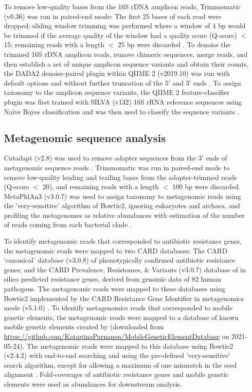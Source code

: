 To remove low-quality bases from the 16S rDNA amplicon reads, Trimmomatic (v0.36) was run in paired-end mode:
The first 25 bases of each read were dropped; sliding window trimming was performed where a window of 4 bp would be trimmed if the average quality of the window had a quality score (Q-score) $<$ 15; remaining reads with a length $<$ 25 bp were discarded \parencite{Bolger.2014}.
To denoise the trimmed 16S rDNA amplicon reads, remove chimeric sequences, merge reads, and then establish a set of unique amplicon sequence variants and obtain their counts, the DADA2 denoise-paired plugin  within QIIME 2 (v2019.10) was run with default options and without further truncation of the 5’ and 3’ ends \parencite{Callahan.2016, Bolyen.2019}.
To assign taxonomy to the amplicon sequence variants, the QIIME 2 feature-classifier plugin was first trained with SILVA (v132) 16S rRNA reference sequences using Naïve Bayes classification and was then used to classify the sequence variants \parencite{Quast.2013, Bokulich.2018}.

\subsection{Metagenomic sequence analysis}

Cutadapt (v2.8) was used to remove adapter sequences from the 3’ ends of metagenomic sequence reads \parencite{Martin.2011}.
Trimmomatic was run in paired-end mode to remove low-quality leading and trailing bases from the adapter-trimmed reads (Q-score $<$ 20), and remaining reads with a length $<$ 100 bp were discarded.
MetaPhlAn3 (v3.0.7) was used to assign taxonomy to metagenomic reads using the 'very-sensitive' algorithm of Bowtie2, ignoring eukaryotes and archaea, and profiling the metagenomes as relative abundances with estimation of the number of reads coming from each bacterial clade \parencite{Beghini.2020}.

To identify metagenomic reads that corresponded to antibiotic resistance genes, the metagenomic reads were mapped to two CARD databases:
The CARD ‘canonical’ database (v3.0.8) of phenotypically confirmed antibiotic resistance genes; and the CARD Prevalence, Resistomes, \& Variants (v3.0.7) database of in silico predicted resistance genes, derived from genomic data of 82 human pathogens.
The metagenomic reads were mapped to these databases using Bowtie2 implemented by the CARD Resistance Gene Identifier in metagenomics mode (v5.1.0) \parencite{Alcock.2020}.
To identify metagenomics reads that corresponded to mobile genetic elements, the metagenomic reads were mapped to a database of known mobile genetic elements created by \cite{Parnanen.2018} (downloaded from \url{https://github.com/KatariinaParnanen/MobileGeneticElementDatabase} on 2021-05-24).
The metagenomic reads were mapped to this database using Bowtie2 (v2.4.2) with end-to-end searching and using the pre-defined 'very-sensitive' search algorithm, except for allowing a maximum of one mismatch in the seed alignment \parencite{Langmead.2012}.
Fold-coverages of antibiotic resistance genes and mobile genetic elements were used as abundances for downstream analysis.

